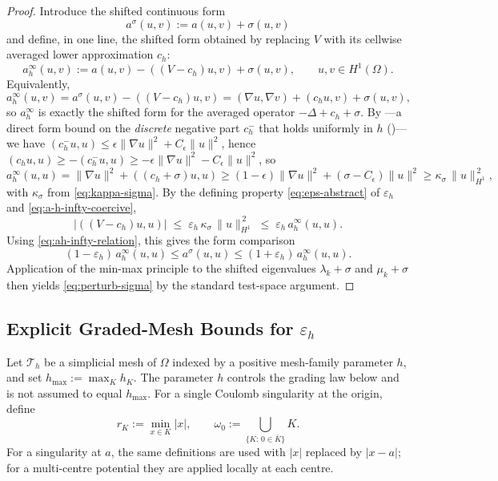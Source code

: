 \documentclass[11pt]{article}
\theoremstyle{plain}
\theoremstyle{definition}
\theoremstyle{remark}
\begin{document}
\begin{proof}
Introduce the shifted continuous form
\[
  a^\sigma(u,v):=a(u,v)+\sigma(u,v)
\]
and define, in one line, the shifted form obtained by replacing
$V$ with its cellwise averaged lower approximation $c_h$:
\begin{equation}
\label{eq:ah-infty-def}
  a_h^\infty(u,v)
  := a(u,v)-((V-c_h)u,v)+\sigma(u,v),
  \qquad u,v\in H^1(\Omega).
\end{equation}
Equivalently,
\begin{equation}
\label{eq:ah-infty-relation}
  a_h^\infty(u,v)
  = a^\sigma(u,v)-((V-c_h)u,v)
  =(\nabla u,\nabla v)+(c_h u,v)+\sigma(u,v),
\end{equation}
so $a_h^\infty$ is exactly the shifted form for the averaged
operator $-\Delta+c_h+\sigma$.  By ---a direct form bound on the
\emph{discrete} negative part $c_h^-$ that holds uniformly in $h$
()---we have
$(c_h^-u,u)\le\epsilon\|\nabla u\|^2+C_\epsilon\|u\|^2$, hence
$(c_h u,u)\ge-(c_h^-u,u)\ge-\epsilon\|\nabla u\|^2-C_\epsilon\|u\|^2$,
so
\begin{equation}
\label{eq:a-h-infty-coercive}
  a_h^\infty(u,u)
  = \|\nabla u\|^2 + ((c_h+\sigma)u,u)
  \ge (1-\epsilon)\|\nabla u\|^2 + (\sigma-C_\epsilon)\|u\|^2
  \ge \kappa_\sigma\,\|u\|_{H^1}^{\,2},
\end{equation}
with $\kappa_\sigma$ from \eqref{eq:kappa-sigma}.
By the defining property \eqref{eq:eps-abstract} of $\varepsilon_h$
and \eqref{eq:a-h-infty-coercive},
\[
  |((V-c_h)u,u)|
  \;\le\; \varepsilon_h\,\kappa_\sigma\,\|u\|_{H^1}^{\,2}
  \;\le\; \varepsilon_h\,a_h^\infty(u,u).
\]
Using \eqref{eq:ah-infty-relation}, this gives the form comparison
\[
  (1-\varepsilon_h)\,a_h^\infty(u,u)
  \le a^\sigma(u,u)
  \le (1+\varepsilon_h)\,a_h^\infty(u,u).
\]
Application of the min-max principle to the shifted eigenvalues
$\lambda_k+\sigma$ and $\mu_k+\sigma$ then yields
\eqref{eq:perturb-sigma} by the standard test-space argument.
\end{proof}

\subsection{Explicit Graded-Mesh Bounds for \texorpdfstring{$\varepsilon_h$}{epsilon\_h}}
\label{subsec:sobolev-constants}

Let $\mathcal T_h$ be a simplicial mesh of $\Omega$ indexed by a
positive mesh-family parameter $h$, and set
$h_{\max}:=\max_K h_K$.  The parameter $h$ controls the grading law
below and is not assumed to equal $h_{\max}$.  For a single Coulomb
singularity at the origin,
define
\[
  r_K:=\min_{x\in K}|x|,
  \qquad
  \omega_0:=\bigcup_{\{K:\,0\in\overline K\}}K.
\]
For a singularity at $a$, the same definitions are used with
$|x|$ replaced by $|x-a|$; for a multi-centre potential they are
applied locally at each centre.
\end{document}
